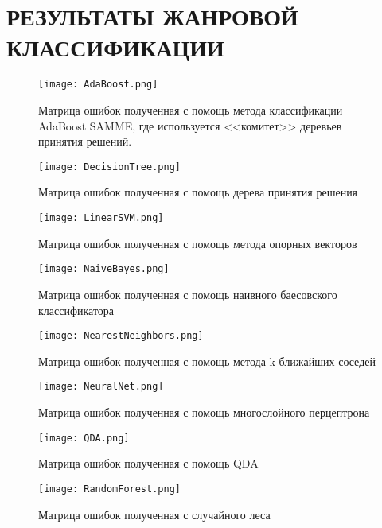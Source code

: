 \section{РЕЗУЛЬТАТЫ ЖАНРОВОЙ КЛАССИФИКАЦИИ}
\label{sec:genre_classification}



\begin{figure}[h]
\centering
  \texttt{[image: AdaBoost.png]}
  \caption{Матрица ошибок полученная с помощь метода классификации AdaBoost SAMME, где используется <<комитет>>  деревьев принятия решений.}
  \label{fig:results:adaboost}
\end{figure}


\begin{figure}[h]
\centering
  \texttt{[image: DecisionTree.png]}
  \caption{Матрица ошибок полученная с помощь дерева принятия решения}
  \label{fig:results:DecisionTree}
\end{figure}


\begin{figure}[h]
\centering
  \texttt{[image: LinearSVM.png]}
  \caption{Матрица ошибок полученная с помощь метода опорных векторов}
  \label{fig:results:LinearSVM}
\end{figure}


\begin{figure}[h]
\centering
  \texttt{[image: NaiveBayes.png]}
  \caption{Матрица ошибок полученная с помощь наивного баесовского классификатора}
  \label{fig:results:NaiveBayes}
\end{figure}

\begin{figure}[h]
\centering
  \texttt{[image: NearestNeighbors.png]}
  \caption{Матрица ошибок полученная с помощь метода k ближайших соседей}
  \label{fig:results:NearestNeighbors}
\end{figure}

\begin{figure}[h]
\centering
  \texttt{[image: NeuralNet.png]}
  \caption{Матрица ошибок полученная с помощь многослойного перцептрона}
  \label{fig:results:NeuralNet}
\end{figure}


\begin{figure}[h]
\centering
  \texttt{[image: QDA.png]}
  \caption{Матрица ошибок полученная с помощь QDA}
  \label{fig:results:QDA}
\end{figure}


\begin{figure}[h]
\centering
  \texttt{[image: RandomForest.png]}
  \caption{Матрица ошибок полученная с случайного леса}
  \label{fig:results:RandomForest}
\end{figure}








